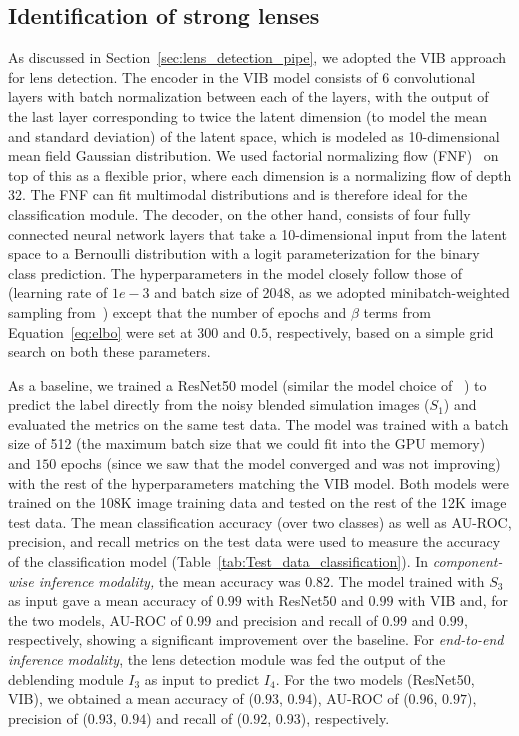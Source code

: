 \documentclass[12pt, twocolumn, apj]{openjournal}
\begin{document}
\subsection{Identification of strong lenses}
As discussed in Section~\ref{sec:lens_detection_pipe}, we adopted the VIB approach 
for lens detection. The encoder in the VIB model consists of $6$ convolutional layers with batch normalization between each of the layers, with the output of the last layer corresponding to twice the latent dimension (to model the mean and standard deviation) of the latent space, which is modeled as 10-dimensional mean field Gaussian distribution. We used factorial normalizing flow (FNF)~\cite{chen2018isolating} on top of this as a flexible prior, where each dimension is a normalizing flow of depth 32. The FNF can fit multimodal distributions and is therefore ideal for the classification module. The decoder, on the other hand, consists of four fully connected neural network layers that take a 10-dimensional input from the latent space to a Bernoulli distribution with a logit parameterization for the binary class prediction. The hyperparameters in the model closely follow those of ~\cite{chen2018isolating} (learning rate of $1e-3$ and batch size of 2048, as we adopted minibatch-weighted sampling from~\cite{chen2018isolating}) except that the number of epochs and $\beta$ terms from Equation~\ref{eq:elbo} were set at $300$ and $0.5$, respectively, based on a simple grid search on both these parameters. 

As a baseline, we trained a ResNet50 model (similar the model choice of ~\cite{lanusse2018cmu}) to predict the label directly from the noisy blended simulation images ($S_1$) and evaluated the metrics on the same test data. The model was trained with a batch size of 512 (the maximum batch size that we could fit into the GPU memory) and $150$ epochs (since we saw that the model converged and was not improving) with the rest of the hyperparameters matching the VIB model. Both models were trained on the 108K image training data and tested on the rest of the 12K image test data. The mean classification accuracy (over two classes) as well as AU-ROC, precision, and recall metrics on the test data were used to measure the accuracy of the classification model (Table~\ref{tab:Test_data_classification}). {In \em{component-wise inference modality,}} the mean accuracy was $0.82$. The model trained with $S_3$ as input gave a mean accuracy of $0.99$ with ResNet50 and $0.99$ with VIB and,  for the two models, AU-ROC of $0.99$ and precision and recall of $0.99$ and $0.99$, respectively, showing a significant improvement over the baseline. 
For {\emph{end-to-end inference modality}}, the lens detection module was fed the output of the deblending module $I_3$ as input to predict $I_4$. For the two models (ResNet50, VIB), we obtained a mean accuracy of ($0.93$, $0.94$), AU-ROC of ($0.96$, $0.97$), precision of ($0.93$, $0.94$) and recall of ($0.92$, $0.93$), respectively.
\end{document}
